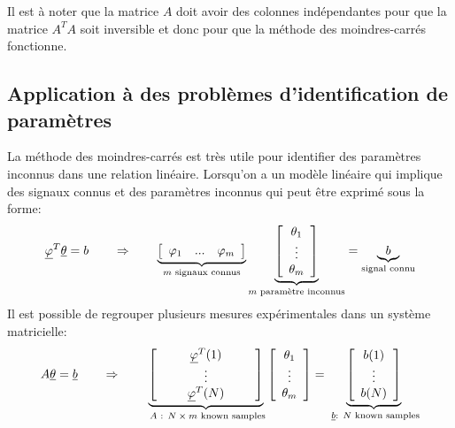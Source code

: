 Il est à noter que la matrice $A$ doit avoir des colonnes indépendantes pour que la matrice $A^T A$ soit inversible et donc pour que la méthode des moindres-carrés fonctionne.


\subsection{Application à des problèmes d'identification de paramètres}


La méthode des moindres-carrés est très utile pour identifier des paramètres inconnus dans une relation linéaire. Lorsqu'on a un modèle linéaire qui implique des signaux connus et des paramètres inconnus qui peut être exprimé sous la forme:
\begin{align}
\underline{\varphi}^T \underline{\theta}
= b
\quad\quad\Rightarrow\quad\quad
\underbrace{ 
\left[ \begin{array}{c c c } 
\varphi_1 & ... & \varphi_m
\end{array} \right] }_{ m \text{ signaux connus} }
\underbrace{ \left[ \begin{array}{c} 
\theta_1 \\ \vdots \\ \theta_m
\end{array} \right] }_{ m \text{ paramètre inconnus} } = 
\underbrace{b}_{\text{signal connu} }
\end{align}
Il est possible de regrouper plusieurs mesures expérimentales dans un système matricielle:
\begin{align}
A \underline{\theta}
= \underline{b}
\quad\quad\Rightarrow\quad\quad
\underbrace{ 
\left[ \begin{array}{c c c c c } 
&& \underline{\varphi}^T(1) && \\
&& \vdots & \\
&& \underline{\varphi}^T(N) && \\
\end{array} \right] }_{\text{ $A$ : $N \times m$  known samples} }
\left[ \begin{array}{c} 
\theta_1 \\ \vdots \\ \theta_m
\end{array} \right]
 = \underbrace{ \left[ \begin{array}{c}  
b(1) \\ \vdots \\ b(N)\\ 
 \end{array} \right] }_{ \text{ $\underline{b}$: $N$ known samples} } 
\end{align}
